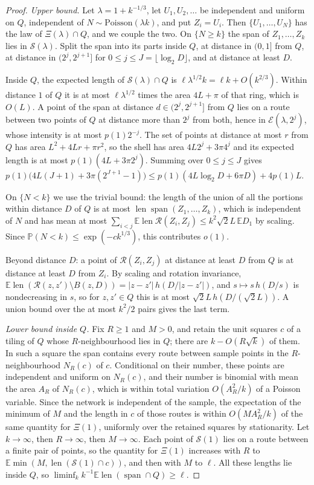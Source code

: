 \documentclass[11pt]{amsart}
\theoremstyle{remark}
\newcommand{\E}{\mathbb{E}}
\newcommand{\Prob}{\mathbb{P}}
\newcommand{\len}{\operatorname{len}}
\newcommand{\spn}{\operatorname{span}}
\begin{document}
\begin{proof}
\emph{Upper bound.} Let $\lambda=1+k^{-1/3}$, let $U_1,U_2,\dots$ be independent and uniform on $Q$, independent of
$N\sim\mathrm{Poisson}(\lambda k)$, and put $Z_i=U_i$. Then $\{U_1,\dots,U_N\}$ has the law of $\Xi(\lambda)\cap Q$,
and we couple the two. On $\{N\ge k\}$ the span of $Z_1,\dots,Z_k$ lies in $\mathcal S(\lambda)$. Split the span into
its parts inside $Q$, at distance in $(0,1]$ from $Q$, at distance in $(2^j,2^{j+1}]$ for $0\le j\le J=\lfloor\log_2
D\rfloor$, and at distance at least $D$.

Inside $Q$, the expected length of $\mathcal S(\lambda)\cap Q$ is $\ell\lambda^{1/2}k=\ell k+O(k^{2/3})$. Within
distance $1$ of $Q$ it is at most $\ell\lambda^{1/2}$ times the area $4L+\pi$ of that ring, which is $O(L)$. A point of
the span at distance $d\in(2^j,2^{j+1}]$ from $Q$ lies on a route between two points of $Q$ at distance more than $2^j$
from both, hence in $\mathcal E(\lambda,2^j)$, whose intensity is at most $p(1)2^{-j}$. The set of points at distance
at most $r$ from $Q$ has area $L^2+4Lr+\pi r^2$, so the shell has area $4L2^j+3\pi4^j$ and its expected length is at
most $p(1)(4L+3\pi2^{j})$. Summing over $0\le j\le J$ gives
$p(1)\bigl(4L(J+1)+3\pi(2^{J+1}-1)\bigr)\le p(1)(4L\log_2D+6\pi D)+4p(1)L$.

On $\{N<k\}$ we use the trivial bound: the length of the union of all the portions within distance $D$ of $Q$ is at
most $\len\spn(Z_1,\dots,Z_k)$, which is independent of $N$ and has mean at most $\sum_{i<j}\E\len\mathcal R(Z_i,Z_j)\le k^2\sqrt2L\,\E D_1$ by scaling. Since
$\Prob(N<k)\le\exp(-ck^{1/3})$, this contributes $o(1)$.

Beyond distance $D$: a point of $\mathcal R(Z_i,Z_j)$ at distance at least $D$ from $Q$ is at distance at least $D$
from $Z_i$. By scaling and rotation invariance,
$\E\len(\mathcal R(z,z')\setminus B(z,D))=|z-z'|\,h(D/|z-z'|)$, and $s\mapsto s\,h(D/s)$ is nondecreasing in $s$, so for
$z,z'\in Q$ this is at most $\sqrt2L\,h(D/(\sqrt2L))$. A union bound over the at most $k^2/2$ pairs gives the last
term.

\emph{Lower bound inside $Q$.} Fix $R\ge1$ and $M>0$, and retain the unit squares $c$ of a tiling of $Q$ whose
$R$-neighbourhood lies in $Q$; there are $k-O(R\sqrt k)$ of them. In such a square the span contains every route
between sample points in the $R$-neighbourhood $N_R(c)$ of $c$. Conditional on their number, these points are
independent and uniform on $N_R(c)$, and their number is binomial with mean the area $A_R$ of $N_R(c)$, which is within
total variation $O(A_R^2/k)$ of a Poisson variable. Since the network is independent of the sample, the expectation of
the minimum of $M$ and the length in $c$ of those routes is within $O(MA_R^2/k)$ of the same quantity for $\Xi(1)$,
uniformly over the retained squares by stationarity. Let $k\to\infty$, then $R\to\infty$, then $M\to\infty$. Each point
of $\mathcal S(1)$ lies on a route between a finite pair of points, so the quantity for $\Xi(1)$ increases with $R$ to
$\E\min(M,\len(\mathcal S(1)\cap c))$, and then with $M$ to $\ell$. All these lengths lie inside $Q$, so
$\liminf_k k^{-1}\E\len(\spn\cap Q)\ge\ell$.


\end{proof}
\end{document}
